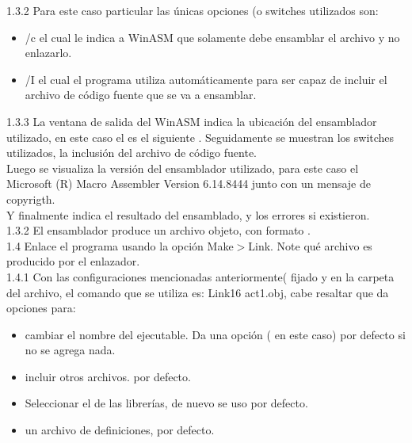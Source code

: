 \large{1.3.2} Para este caso particular las únicas opciones (o switches utilizados son:
\begin{itemize}

  \item  /c  el cual le indica a WinASM que solamente debe ensamblar el archivo y no enlazarlo.
  \item /I el cual el programa utiliza automáticamente para ser capaz de incluir el archivo de código fuente  que se va a ensamblar.
\end{itemize}



\large{1.3.3} La ventana de salida del WinASM indica la ubicación del ensamblador utilizado, en este caso el  es el siguiente . Seguidamente se muestran los switches utilizados, la inclusión del archivo de código fuente.\\
Luego se visualiza la versión del ensamblador utilizado, para este caso el Microsoft (R) Macro Assembler Version 6.14.8444 junto con un mensaje de copyrigth. \\
 Y finalmente indica el resultado del ensamblado, y los errores si existieron.\\



\large{1.3.2} El ensamblador produce un archivo objeto, con formato .\\





\large{1.4} Enlace el programa usando la opción Make$>$Link. Note qué archivo es producido por el enlazador.\\


\large{1.4.1} Con las configuraciones mencionadas anteriormente( fijado y en la carpeta del archivo, el comando que se utiliza es:  Link16 act1.obj, cabe resaltar que da opciones para:
\begin{itemize}
  \item cambiar el nombre del ejecutable. Da una opción ( en este caso) por defecto si no se agrega nada.

  \item incluir otros archivos.  por defecto.

  \item Seleccionar el  de las librerías, de nuevo se uso por defecto.

  \item un archivo de definiciones,  por defecto.
\end{itemize}


